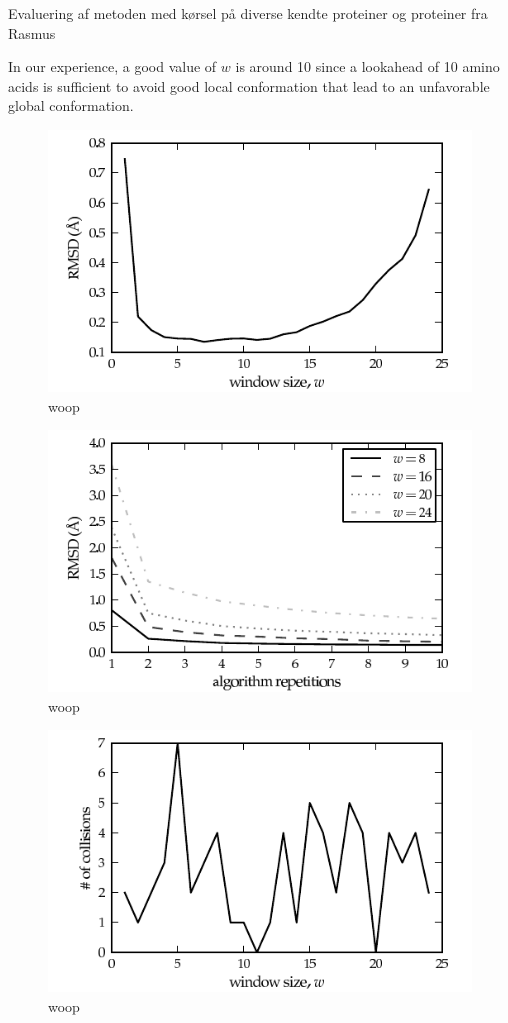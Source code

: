 Evaluering af metoden med kørsel på diverse kendte proteiner og
proteiner fra Rasmus

In our experience, a good value of $w$ is around 10 since a lookahead of 10 amino acids is sufficient to avoid good local conformation that lead to an unfavorable global conformation.
\begin{figure}
	\centering
	\hspace*{-3.5mm}\includegraphics[width=1.1\columnwidth]{figures/plot_rmsd}
	\caption{woop}
\end{figure}

\begin{figure}
	\centering
	\hspace*{-3.5mm}\includegraphics[width=1.1\columnwidth]{figures/plot_rmsd_convergence}
	\caption{woop}
\end{figure}

\begin{figure}
	\centering
	\hspace*{-3.5mm}\includegraphics[width=1.1\columnwidth]{figures/plot_collisions}
	\caption{woop}
\end{figure}




